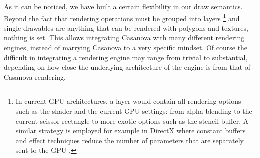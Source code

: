As it can be noticed, we have built a certain flexibility in our draw semantics. Beyond the fact that rendering operations must be grouped into layers \footnote{In current GPU architectures, a layer would contain all rendering options such as the shader and the current GPU settings: from alpha blending to the current scissor rectangle to more exotic options such as the stencil buffer. A similar strategy is employed for example in DirectX where constant buffers and effect techniques reduce the number of parameters that are separately sent to the GPU \cite{CHAPTER_5_HLSL_TECHNIQUE, CHAPTER_5_HLSL_CONSTANT_BUFFER}.} and single drawables are anything that can be rendered with polygons and textures, nothing is set. This allows integrating Casanova with many different rendering engines, instead of marrying Casanova to a very specific mindset. Of course the difficult in integrating a rendering engine may range from trivial to substantial, depending on how close the underlying architecture of the engine is from that of Casanova rendering.


